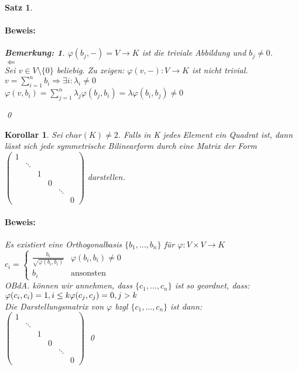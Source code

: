 \documentclass{report}
\newcommand{\lb}{\lambda}
\theoremstyle{customrem}
\newtheorem*{bemerkung}{Bemerkung\textnormal:}
\theoremstyle{customdef}
\newtheorem{korrolar}[definition]{Korollar}
\newtheorem{satz}[definition]{Satz}
\renewenvironment{proof}{\paragraph{Beweis: }}{\qed}
\theoremstyle{customenv}
\begin{document}
\begin{satz}
\begin{proof}
\begin{bemerkung}
      \) \(\varphi(b_j, -) = V \to K\) ist die triviale Abbildung und 
      \(b_j \neq 0\).\\
      \(\Leftarrow\)\\
      Sei \(v \in V \setminus \{0\}\) beliebig. Zu zeigen:
      \(\varphi(v, -) : V \to K\) ist nicht trivial.\\
      \(v = \sum_{i=1}^n b_i \Rightarrow \exists i : \lb_i \neq 0\)\\
      \(\varphi(v, b_i) = \sum_{j=1}^n \lb_j \varphi(b_j, b_i)
      = \lb \varphi(b_i, b_j) \neq 0\)
    \end{bemerkung}
  \end{proof}
\end{satz}

\begin{korrolar}
  Sei \(char(K) \neq 2\). Falls in K jedes Element ein Quadrat ist, dann
  l\"asst sich jede symmetrische Bilinearform  durch eine Matrix der Form
  \(\begin{pmatrix}
    1\\
    &\ddots\\
    &&1\\
    &&&0\\
    &&&&\ddots\\
    &&&&&0
  \end{pmatrix}\) darstellen.
  \begin{proof}
    Es existiert eine Orthogonalbasis \(\{b_1, \dots, b_n\}\) f\"ur
    \(\varphi : V \times V \to K\)\\
    \(c_i = \begin{cases}
    \frac{b_i}{\sqrt{\varphi(b_i, b_i)}} & \varphi(b_i, b_i) \neq 0\\
    b_i & \text{ansonsten}
    \end{cases}
    \)\\
    OBdA. k\"onnen wir annehmen, dass \(\{c_1, \dots, c_n\}\) ist so geordnet,
    dass:\\
    \(\varphi(c_i, c_i) = 1, i \le k\\
    \varphi(c_j, c_j) = 0,  j > k\)\\
    Die Darstellungsmatrix von \(\varphi\) bzgl \(\{c_1, \dots, c_n\}\) ist
    dann:\\
    \(
    \begin{pmatrix}
    1\\
    &\ddots\\
    &&1\\
    &&&0\\
    &&&&\ddots\\
    &&&&&0
    \end{pmatrix}
    \)
  \end{proof}
\end{korrolar}
\end{document}
